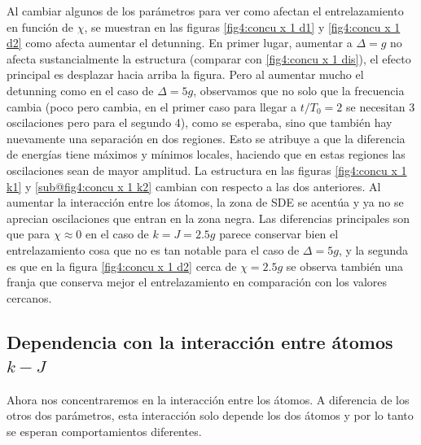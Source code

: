 Al cambiar algunos de los parámetros para ver como afectan el entrelazamiento en función de $\chi$, se muestran en las figuras \ref{fig4:concu x 1 d1} y \ref{fig4:concu x 1 d2} como afecta aumentar el detunning. En primer lugar, aumentar a $\Delta=g$ no afecta sustancialmente la estructura (comparar con \ref{fig4:concu x 1 dis}), el efecto principal es desplazar hacia arriba la figura. Pero al aumentar mucho el detunning como en el caso de $\Delta=5g$, observamos que no solo que la frecuencia cambia (poco pero cambia, en el primer caso para llegar a $t/T_0=2$ se necesitan 3 oscilaciones pero para el segundo 4), como se esperaba, sino que también hay nuevamente una separación en dos regiones. Esto se atribuye a que la diferencia de energías tiene máximos y mínimos locales, haciendo que en estas regiones las oscilaciones sean de mayor amplitud. La estructura en las figuras \ref{fig4:concu x 1 k1} y \ref{sub@fig4:concu x 1 k2} cambian con respecto a las dos anteriores. Al aumentar la interacción entre los átomos, la zona de SDE se acentúa y ya no se aprecian oscilaciones que entran en la zona negra. Las diferencias principales son que para $\chi \approx 0$ en el caso de $k=J=2.5g$ parece conservar bien el entrelazamiento cosa que no es tan notable para el caso de $\Delta=5g$, y la segunda es que en la figura \ref{fig4:concu x 1 d2} cerca de $\chi=2.5g$ se observa también una franja que conserva mejor el entrelazamiento en comparación con los valores cercanos.
\newpage
\subsection{Dependencia con la interacción entre átomos $k-J$}
Ahora nos concentraremos en la interacción entre los átomos. A diferencia de los otros dos parámetros, esta interacción solo depende los dos átomos y por lo tanto se esperan comportamientos diferentes. 
